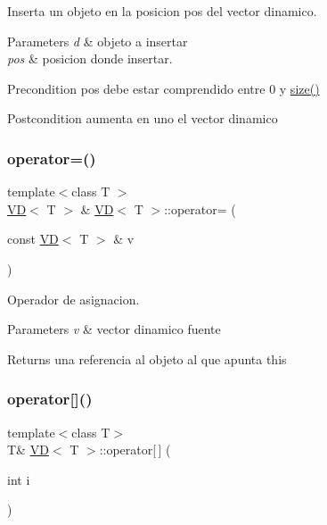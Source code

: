 Inserta un objeto en la posicion pos del vector dinamico. 


\begin{DoxyParams}{Parameters}
{\em d} & objeto a insertar \\
\hline
{\em pos} & posicion donde insertar. \\
\hline
\end{DoxyParams}
\begin{DoxyPrecond}{Precondition}
pos debe estar comprendido entre 0 y \hyperlink{class_v_d_a411ad026db1c8e0617d9031f1f1017a5}{size()} 
\end{DoxyPrecond}
\begin{DoxyPostcond}{Postcondition}
aumenta en uno el vector dinamico 
\end{DoxyPostcond}
\mbox{\label{class_v_d_a645b65a6343059cd921f6a2856c97249}} 
\subsubsection{\texorpdfstring{operator=()}{operator=()}}
{\footnotesize\ttfamily template$<$class T $>$ \\
\hyperlink{class_v_d}{VD}$<$ T $>$ \& \hyperlink{class_v_d}{VD}$<$ T $>$\+::operator= (\begin{DoxyParamCaption}\item[{const \hyperlink{class_v_d}{VD}$<$ T $>$ \&}]{v }\end{DoxyParamCaption})}



Operador de asignacion. 


\begin{DoxyParams}{Parameters}
{\em v} & vector dinamico fuente \\
\hline
\end{DoxyParams}
\begin{DoxyReturn}{Returns}
una referencia al objeto al que apunta this 
\end{DoxyReturn}
\mbox{\label{class_v_d_a7d80240b5791d62b7e27657763afe712}} 
\subsubsection{\texorpdfstring{operator[]()}{operator[]()}}
{\footnotesize\ttfamily template$<$class T$>$ \\
T\& \hyperlink{class_v_d}{VD}$<$ T $>$\+::operator\mbox{[}$\,$\mbox{]} (\begin{DoxyParamCaption}\item[{int}]{i }\end{DoxyParamCaption})\hspace{0.3cm}{\ttfamily [inline]}}




